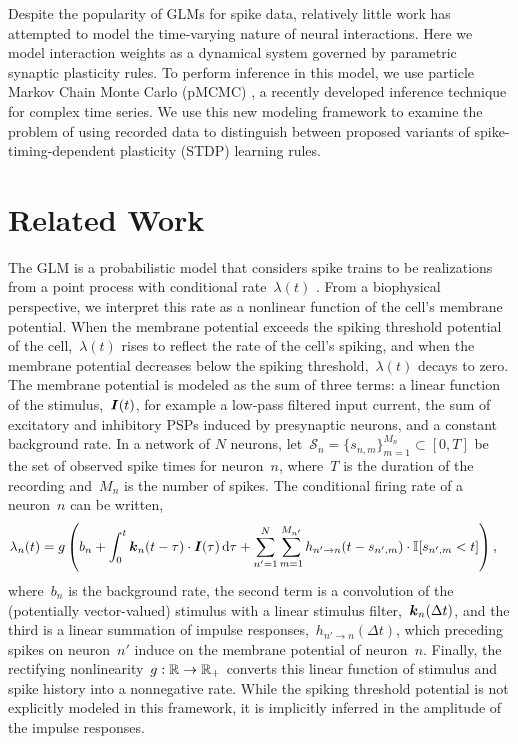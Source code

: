 Despite the popularity of GLMs for spike data, relatively little work
has attempted to model the time-varying nature of neural interactions.
Here we model interaction weights as a dynamical system governed by
parametric synaptic plasticity rules. To perform inference in this
model, we use particle Markov Chain Monte Carlo (pMCMC)
\cite{Andrieu-2010}, a recently developed inference technique for
complex time series.  We use this new modeling framework to examine
the problem of using recorded data to distinguish between proposed
variants of spike-timing-dependent plasticity (STDP) learning rules.

\section{Related Work}
The GLM is a probabilistic model that considers spike trains to be
realizations from a point process with conditional rate~$\lambda(t)$
\cite{Paninski-2004, Truccolo-2005}. From a biophysical perspective,
we interpret this rate as a nonlinear function of the cell's membrane
potential. When the membrane potential exceeds the spiking threshold
potential of the cell,~$\lambda(t)$ rises to reflect the rate of the
cell's spiking, and when the membrane potential decreases below the
spiking threshold,~$\lambda(t)$ decays to zero. The membrane potential
is modeled as the sum of three terms: a linear function of the
stimulus,~${\boldsymbol{I}(t)}$, for example a low-pass filtered input current,
the sum of excitatory and inhibitory PSPs induced by presynaptic
neurons, and a constant background rate. In a network of $N$ neurons,
let~${\mathcal{S}_{n}=\{s_{n,m}\}_{m=1}^{M_n} \subset [0,T]}$ be the
set of observed spike times for neuron~$n$, where~$T$ is the duration
of the recording and~$M_n$ is the number of spikes. The conditional
firing rate of a neuron~$n$ can be written,
\begin{align}
  \lambda_{n}(t) &= g\left(b_n + \int_0^t \boldsymbol{k}_n(t-\tau) \cdot \boldsymbol{I}(\tau)\,\mathrm{d} \tau + \sum_{n'=1}^N\sum_{m=1}^{M_{n'}} h_{n'\to n}(t-s_{n',m}) \cdot \mathbb{I}[s_{n',m} < t] \right),
  \label{eqn:glm_rate}
\end{align}
where~$b_n$ is the background rate, the second term is a convolution
of the (potentially vector-valued) stimulus with a linear stimulus
filter,~${\boldsymbol{k}_n(\Delta t)}$, and the third is a linear summation of
impulse responses,~$h_{n'\to n}(\Delta t)$, which preceding spikes on
neuron~$n'$ induce on the membrane potential of neuron~$n$. Finally,
the rectifying nonlinearity~${g:\mathbb{R}\to \mathbb{R}_+}$ converts this
linear function of stimulus and spike history into a nonnegative
rate. While the spiking threshold potential is not explicitly modeled
in this framework, it is implicitly inferred in the amplitude of the
impulse responses.

